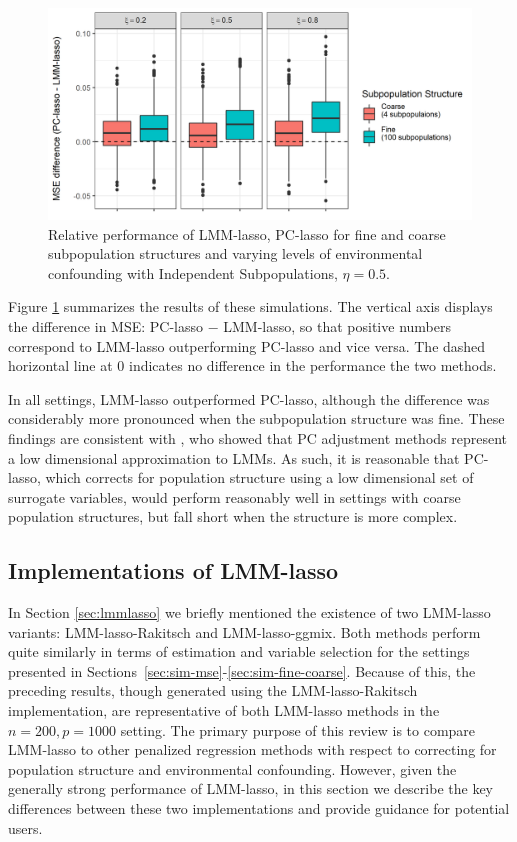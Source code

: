 \begin{figure}[H]
    \centering
    \includegraphics[scale = 0.9]{figures/mse_diff_subpops.png}
    \caption{Relative performance of LMM-lasso, PC-lasso for fine and coarse subpopulation structures and varying levels of environmental confounding with Independent Subpopulations, $\eta = 0.5$. }
    \label{fig:big_vs_small}
\end{figure}

Figure \ref{fig:big_vs_small} summarizes the results of these simulations. The vertical axis displays the difference in MSE: PC-lasso $-$ LMM-lasso, so that positive numbers correspond to LMM-lasso outperforming PC-lasso and vice versa. The dashed horizontal line at 0 indicates no difference in the performance the two methods.

In all settings, LMM-lasso outperformed PC-lasso, although the difference was considerably more pronounced when the subpopulation structure was fine.  These findings are consistent with \citet{hoffman2013correcting}, who showed that PC adjustment methods represent a low dimensional approximation to LMMs. As such, it is reasonable that PC-lasso, which corrects for population structure using a low dimensional set of surrogate variables, would perform reasonably well in settings with coarse population structures, but fall short when the structure is more complex.

\subsection{Implementations of LMM-lasso}

In Section \ref{sec:lmmlasso} we briefly mentioned the existence of two LMM-lasso variants: LMM-lasso-Rakitsch and LMM-lasso-ggmix. Both methods perform quite similarly in terms of estimation and variable selection for the settings presented in Sections~\ref{sec:sim-mse}-\ref{sec:sim-fine-coarse}. Because of this, the preceding results, though generated using the LMM-lasso-Rakitsch implementation, are representative of both LMM-lasso methods in the $n = 200, p = 1000$ setting. The primary purpose of this review is to compare LMM-lasso to other penalized regression methods with respect to correcting for population structure and environmental confounding. However, given the generally strong performance of LMM-lasso, in this section we describe the key differences between these two implementations and provide guidance for potential users.

